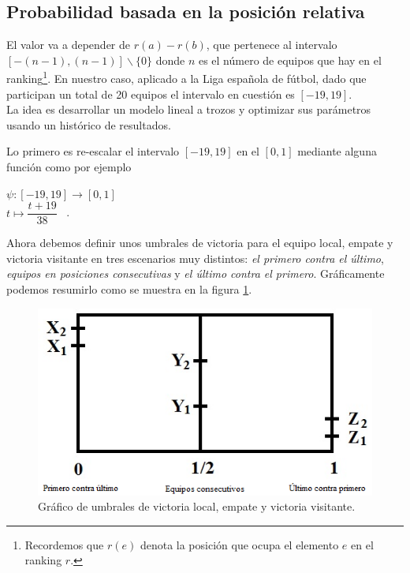 \subsection{Probabilidad basada en la posición relativa}
El valor va a depender de $r(a)-r(b)$, que pertenece al intervalo $[-(n-1),(n-1)] \backslash \{0\}$ donde $n$ es el número de equipos que hay en el ranking\footnote{Recordemos que $r(e)$ denota la posición que ocupa el elemento $e$ en el ranking $r$.}. En nuestro caso, aplicado a la Liga española de fútbol, dado que participan un total de 20 equipos el intervalo en cuestión es $[-19,19]$.\\

La idea es desarrollar un modelo lineal a trozos y optimizar sus parámetros usando un histórico de resultados.\\

\newpage

Lo primero es re-escalar el intervalo $[-19,19]$ en el $[0,1]$ mediante alguna función como por ejemplo
\begin{center}
	$ \psi: [-19,19] \longrightarrow [0,1]$\\
	$ t \longmapsto \dfrac{t+19}{38}$ \ .
\end{center}

Ahora debemos definir unos umbrales de victoria para el equipo local, empate y victoria visitante en tres escenarios muy distintos: \textit{el primero contra el último}, \textit{equipos en posiciones consecutivas} y \textit{el último contra el primero}. Gráficamente podemos resumirlo como se muestra en la figura \ref{fig:umbrales}.

\begin{figure}[htb]
		\centering
		\includegraphics[scale=0.7]{images/umbrales.png}
		\caption{Gráfico de umbrales de victoria local, empate y victoria visitante.} \label{fig:umbrales}
\end{figure}

